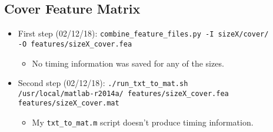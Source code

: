 \documentclass[11pt,a4paper]{report}
\begin{document}
\subsection{Cover Feature Matrix}
\begin{itemize}
\item First step (02/12/18): \texttt{combine\_feature\_files.py -I sizeX/cover/} \\
         \texttt{-O features/sizeX\_cover.fea}
  \begin{itemize}
  \item No timing information was saved for any of the sizes.
  \end{itemize}

\item Second step (02/12/18): \texttt{./run\_txt\_to\_mat.sh} \\
         \texttt{/usr/local/matlab-r2014a/ features/sizeX\_cover.fea} \\
         \texttt{features/sizeX\_cover.mat}
  \begin{itemize}
  \item My \texttt{txt\_to\_mat.m} script doesn't produce timing information.
  \end{itemize}
\end{itemize}
\end{document}
